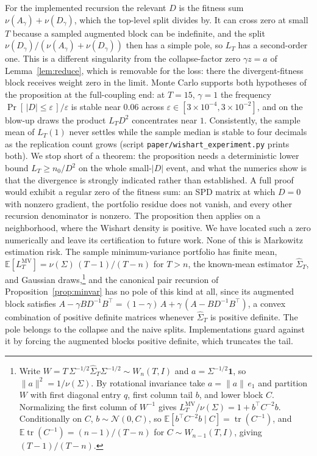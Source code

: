 \documentclass[11pt]{article}
\theoremstyle{remark}
\newcommand{\E}{\mathbb{E}}
\begin{document}
For the implemented recursion the relevant $D$ is the fitness sum
$\nu(A_\gamma) + \nu(D_\gamma)$, which the top-level split divides by. It
can cross zero at small $T$ because a sampled augmented block can be
indefinite, and the split $\nu(D_\gamma)/(\nu(A_\gamma) + \nu(D_\gamma))$
then has a simple pole, so $L_T$ has a second-order one. This is a
different singularity from the collapse-factor zero $\gamma z = a$ of
Lemma~\ref{lem:reduce}, which is removable for the loss: there the
divergent-fitness block receives weight zero in the limit. Monte Carlo
supports both hypotheses of the proposition at the full-coupling end: at
$T = 15$, $\gamma = 1$ the frequency
$\Pr[\,|D| \le \varepsilon\,]/\varepsilon$ is stable near $0.06$ across
$\varepsilon \in [3 \times 10^{-4}, 3 \times 10^{-2}]$, and on the
blow-up draws the product $L_T D^2$ concentrates near $1$. Consistently,
the sample mean of $L_T(1)$ never settles while the sample median is
stable to four decimals as the replication count grows
(script \texttt{paper/wishart\_experiment.py} prints both). We stop
short of a theorem: the proposition needs a deterministic lower bound
$L_T \ge n_0/D^2$ on the whole small-$|D|$ event, and what the numerics
show is that the divergence is strongly indicated rather than
established. A full proof would exhibit a regular zero of the fitness
sum: an SPD matrix at which $D = 0$ with nonzero gradient, the
portfolio residue does not vanish, and every other recursion
denominator is nonzero. The proposition then applies on a neighborhood,
where the Wishart density is positive. We have located such a zero
numerically and leave its certification to future work. None of this
is Markowitz estimation risk. The sample minimum-variance portfolio has
finite mean, $\E[L_T^{\mathrm{MV}}] = \nu(\Sigma)\,(T-1)/(T-n)$ for
$T > n$, the known-mean estimator $\widehat\Sigma_T$, and Gaussian
draws,\footnote{Write $W = T\,\Sigma^{-1/2}\widehat\Sigma_T
\Sigma^{-1/2} \sim W_n(T, I)$ and $a = \Sigma^{-1/2}\mathbf{1}$, so
$\|a\|^2 = 1/\nu(\Sigma)$. By rotational invariance take
$a = \|a\|\,e_1$ and partition $W$ with first diagonal entry $q$,
first column tail $b$, and lower block $C$. Normalizing the first
column of $W^{-1}$ gives $L_T^{\mathrm{MV}}/\nu(\Sigma) = 1 +
b^\top C^{-2} b$. Conditionally on $C$, $b \sim \mathcal{N}(0, C)$, so
$\E[b^\top C^{-2} b \mid C] = \operatorname{tr}(C^{-1})$, and
$\E\operatorname{tr}(C^{-1}) = (n-1)/(T-n)$ for
$C \sim W_{n-1}(T, I)$, giving $(T-1)/(T-n)$.}
and the canonical pair recursion of Proposition~\ref{prop:minvar} has no
pole of this kind at all, since its augmented block satisfies
$A - \gamma B D^{-1} B^\top = (1-\gamma)\,A + \gamma\,(A - BD^{-1}B^\top)$,
a convex combination of positive definite matrices whenever
$\widehat\Sigma_T$ is positive definite. The pole belongs to the collapse
and the naive splits. Implementations guard against it by forcing the
augmented blocks positive definite, which truncates the tail.
\end{document}
